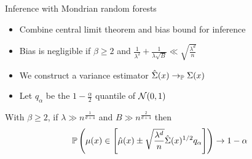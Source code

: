 \documentclass{beamer}
\begin{document}
\begin{frame}{Inference with Mondrian random forests}

  \begin{itemize}
    \item
      Combine central limit theorem and bias bound for inference
    \item Bias is negligible if $\beta \geq 2$ and
      $\frac{1}{\lambda^2} + \frac{1}{\lambda \sqrt B}
      \ll \sqrt{\frac{\lambda^d}{n}}$
    \item We construct a variance estimator
      $\hat\Sigma(x) \to_\P \Sigma(x)$
    \item Let $q_{\alpha}$ be the
      $1 - \frac{\alpha}{2}$ quantile of $\cN(0,1)$
  \end{itemize}

  \vspace*{3mm}
  \begin{beamertheorem}%
    With $\beta \geq 2$,
    if $\lambda \gg n^{\frac{1}{d + 4}}$
    and $B \gg n^{\frac{2}{d + 4}}$ then
    \vspace*{-1mm}
    \begin{align*}
      \P \left(
        \mu(x) \in
        \left[
          \hat \mu(x)
          \pm \sqrt{\frac{\lambda^d}{n}} \hat \Sigma(x)^{1/2}
          q_{\alpha}
        \right]
      \right)
      \to
      1 - \alpha
    \end{align*}
    \vspace*{-3mm}
  \end{beamertheorem}

\end{frame}
\end{document}
